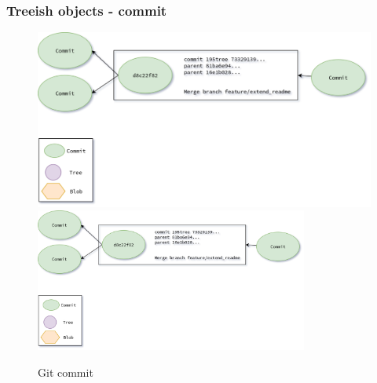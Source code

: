 \begin{frame}[noframenumbering]
    \frametitle{Treeish objects - commit}
    \addtocounter{page}{-1}
    \begin{figure}
        \begin{center}
            {
                \includegraphics[height=0.70\textheight,keepaspectratio]{./images/Treeish_Commit.png}
            }
            {
                \includegraphics[height=0.6\textheight,width=0.8\textwidth]{./images/Treeish_Commit.png}
            }
            \caption{Git commit}
        \end{center}
    \end{figure}
\end{frame}

